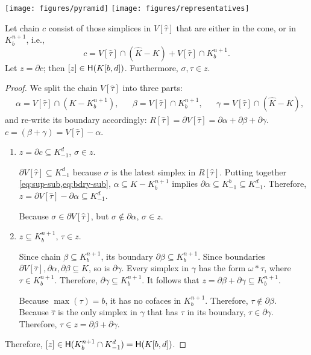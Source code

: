 \documentclass[cleveref,a4paper,english,nolineno]{socg-lipics-v2021}
\newcommand{\Hgr}{{\sf H}}
\newcommand{\cone}[1]{\hat{#1}}
\newcommand{\bdry}{\partial}
\newcommand{\cK}{\cone{K}}
\newcommand{\subK}[1]{K_{-1}^{#1}}
\newcommand{\supK}[1]{K_{#1}^{n+1}}
\newcommand{\ssx}{\sigma}
\newcommand{\tsx}{\tau}
\newcommand{\ctsx}{\cone{\tsx}}
\begin{document}
    \texttt{[image: figures/pyramid]}
        \quad
    \texttt{[image: figures/representatives]}


    \begin{claim}
        \label{clm:extended-oo-structure}
        Let chain $c$ consist of those
        simplices in $V[\ctsx]$ that are either in the cone, or in $\supK{b}$,
        i.e.,
        \[
            c = V[\ctsx] \cap (\cK - K) + V[\ctsx] \cap \supK{b}.
        \]
        Let $z = \bdry c$; then $[z] \in \Hgr(K[b,d])$.
        Furthermore, $\ssx, \tsx \in z$.
    \end{claim}
    \begin{proof}
        We split the chain $V[\ctsx]$ into three parts:
        \begin{align*}
            & \alpha = V[\ctsx] \cap (K - \supK{b}), &
            & \beta  = V[\ctsx] \cap \supK{b}, &
            & \gamma = V[\ctsx] \cap (\cK - K),
        \end{align*}
        and re-write its boundary accordingly:
        $
            R[\ctsx] = \bdry V[\ctsx] = \bdry \alpha + \bdry \beta + \bdry \gamma.
        $
        $c = (\beta + \gamma) = V[\ctsx] - \alpha$.

        \begin{enumerate}
            \item
                $z = \bdry c \subseteq \subK{d}$, $\ssx \in z$.

                $\bdry V[\ctsx] \subseteq \subK{d}$ because $\ssx$ is the latest
                simplex in $R[\ctsx]$.
                Putting together \cref{eq:sup-sub,eq:bdry-sub},
                $\alpha \subseteq K - \supK{b}$ implies $\bdry \alpha \subseteq \subK{b} \subseteq \subK{d}$.
                Therefore, $z = \bdry V[\ctsx] - \bdry \alpha \subseteq \subK{d}$.

                Because $\ssx \in \bdry V[\ctsx]$, but $\ssx \not\in \bdry \alpha$,
                $\ssx \in z$.

            \item
                $z \subseteq \supK{b}$, $\tsx \in z$.

                Since chain $\beta \subseteq \supK{b}$, its boundary $\bdry \beta \subseteq \supK{b}$.
                Since boundaries $\bdry V[\ctsx], \bdry \alpha, \bdry \beta \subseteq K$, so is $\bdry \gamma$.
                Every simplex in $\gamma$ has the form $\omega * \tsx$, where
                $\tsx \in \supK{b}$. Therefore, $\bdry \gamma \subseteq \supK{b}$.
                It follows that $z = \bdry \beta + \bdry \gamma \subseteq \supK{b}$.

                Because $\max(\tsx) = b$, it has no cofaces in $\supK{b}$.
                Therefore, $\tsx \not\in \bdry \beta$. Because $\ctsx$ is the
                only simplex in $\gamma$ that has $\tsx$ in its boundary,
                $\tsx \in \bdry \gamma$. Therefore, $\tsx \in z = \bdry \beta + \bdry \gamma$.
        \end{enumerate}

        Therefore, $[z] \in \Hgr(\supK{b} \cap \subK{d}) = \Hgr(K[b,d])$.
    \end{proof}
\end{document}
